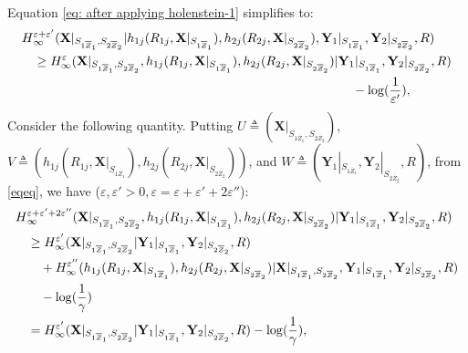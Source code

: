 \documentclass[runningheads]{llncs}
\begin{document}
Equation \eqref{eq: after applying holenstein-1} simplifies to:
\begin{align}\label{eq: middle}
    H&^{\varepsilon+\varepsilon'}_{\infty}(\mathbf{X}|_{S_{1\overline{Z}_1},S_{2\overline{Z}_2}}| h_{1j}(R_{1j},\mathbf{X}|_{S_{1\overline{Z}_1}}),   h_{2j}(R_{2j},\mathbf{X}|_{S_{2\overline{Z}_2}}),\mathbf{Y}_1|_{S_{1\overline{Z}_1}},\mathbf{Y}_2|_{S_{2\overline{Z}_2}}, R)\notag\\
    & \geq H_\infty^\varepsilon (\mathbf{X}|_{S_{1\overline{Z}_1},S_{2\overline{Z}_2}},h_{1j}(R_{1j}, \mathbf{X}|_{S_{1\overline{Z}_1}}),h_{2j}(R_{2j}, \mathbf{X}|_{S_{2\overline{Z}_2}})|\mathbf{Y}_1|_{S_{1\overline{Z}_1}},\mathbf{Y}_2|_{S_{2\overline{Z}_2}}, R)\notag\\
    & \qquad\qquad\qquad\qquad\qquad\qquad\qquad\qquad\qquad\qquad\qquad\qquad\quad- \log(\frac{1}{\varepsilon'}),
\end{align}
Consider the following quantity. Putting $U\triangleq (\mathbf{X}|_{S_{1\overline{Z}_1},S_{2\overline{Z}_2}})$,\linebreak $ V \triangleq (h_{1j}(R_{1j}, \mathbf{X}|_{S_{1\overline{Z}_1}}), h_{2j}(R_{2j}, \mathbf{X}|_{S_{2\overline{Z}_2}}))$, and $W \triangleq (\mathbf{Y}_1|_{S_{1\overline{Z}_1}},\mathbf{Y}_2|_{S_{2\overline{Z}_2}}, R)$, from \eqref{eqeq}, we have ($\varepsilon, \varepsilon'>0, \varepsilon = \varepsilon + \varepsilon' + 2\varepsilon''$):
\begin{align}\label{epsilon'}
     H&^{\varepsilon+\varepsilon'+2\varepsilon''}_{\infty}(\mathbf{X}|_{S_{1\overline{Z}_1},S_{2\overline{Z}_2}}, h_{1j}(R_{1j}, \mathbf{X}|_{S_{1\overline{Z}_1}}), h_{2j}(R_{2j}, \mathbf{X}|_{S_{2\overline{Z}_2}})| \mathbf{Y}_1|_{S_{1\overline{Z}_1}},\mathbf{Y}_2|_{S_{2\overline{Z}_2}}, R)\notag\\
        & \geq H^{\varepsilon'}_{\infty}(\mathbf{X}|_{S_{1\overline{Z}_1},S_{2\overline{Z}_2}}| \mathbf{Y}_1|_{S_{1\overline{Z}_1}},\mathbf{Y}_2|_{S_{2\overline{Z}_2}}, R)\notag\\
            & \quad + H^{\varepsilon''}_{\infty}(h_{1j}(R_{1j}, \mathbf{X}|_{S_{1\overline{Z}_1}}), h_{2j}(R_{2j}, \mathbf{X}|_{S_{2\overline{Z}_2}})|\mathbf{X}|_{S_{1\overline{Z}_1},S_{2\overline{Z}_2}}, \mathbf{Y}_1|_{S_{1\overline{Z}_1}},\mathbf{Y}_2|_{S_{2\overline{Z}_2}}, R)\notag\\
            & \quad-\log(\frac{1}{\gamma})\notag\\
            & = H^{\varepsilon'}_{\infty}(\mathbf{X}|_{S_{1\overline{Z}_1},S_{2\overline{Z}_2}}| \mathbf{Y}_1|_{S_{1\overline{Z}_1}},\mathbf{Y}_2|_{S_{2\overline{Z}_2}}, R) - \log(\frac{1}{\gamma}),
        \end{align}
\end{document}
